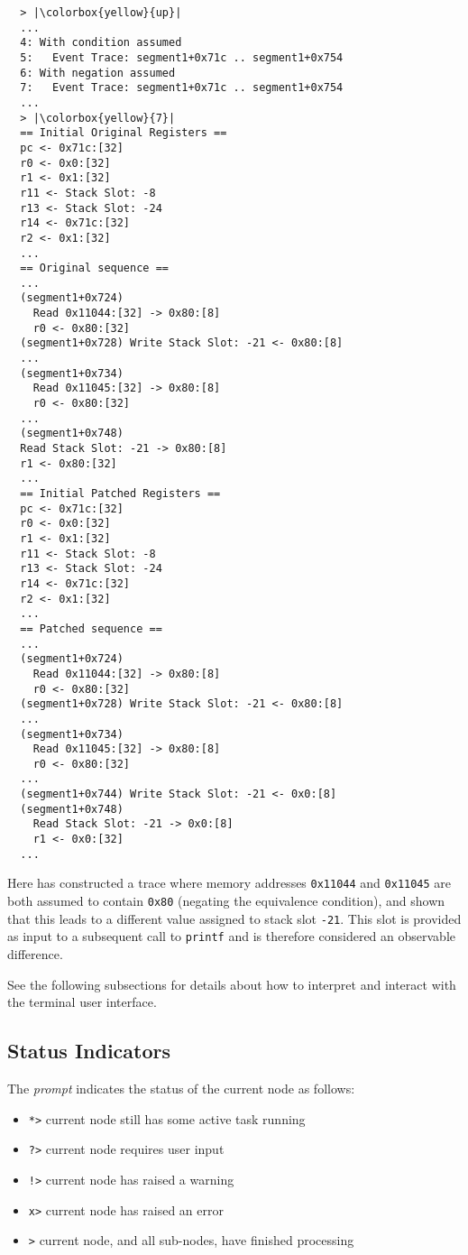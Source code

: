 \begin{lstlisting}
  > |\colorbox{yellow}{up}|
  ...
  4: With condition assumed
  5:   Event Trace: segment1+0x71c .. segment1+0x754
  6: With negation assumed
  7:   Event Trace: segment1+0x71c .. segment1+0x754
  ...
  > |\colorbox{yellow}{7}|
  == Initial Original Registers ==
  pc <- 0x71c:[32]
  r0 <- 0x0:[32]
  r1 <- 0x1:[32]
  r11 <- Stack Slot: -8
  r13 <- Stack Slot: -24
  r14 <- 0x71c:[32]
  r2 <- 0x1:[32]
  ...
  == Original sequence ==
  ...
  (segment1+0x724)
    Read 0x11044:[32] -> 0x80:[8] 
    r0 <- 0x80:[32]
  (segment1+0x728) Write Stack Slot: -21 <- 0x80:[8] 
  ...
  (segment1+0x734)
    Read 0x11045:[32] -> 0x80:[8] 
    r0 <- 0x80:[32]
  ...
  (segment1+0x748)
  Read Stack Slot: -21 -> 0x80:[8] 
  r1 <- 0x80:[32]
  ...
  == Initial Patched Registers ==
  pc <- 0x71c:[32]
  r0 <- 0x0:[32]
  r1 <- 0x1:[32]
  r11 <- Stack Slot: -8
  r13 <- Stack Slot: -24
  r14 <- 0x71c:[32]
  r2 <- 0x1:[32]
  ...
  == Patched sequence ==
  ...
  (segment1+0x724)
    Read 0x11044:[32] -> 0x80:[8] 
    r0 <- 0x80:[32]
  (segment1+0x728) Write Stack Slot: -21 <- 0x80:[8] 
  ...
  (segment1+0x734)
    Read 0x11045:[32] -> 0x80:[8] 
    r0 <- 0x80:[32]
  ...
  (segment1+0x744) Write Stack Slot: -21 <- 0x0:[8] 
  (segment1+0x748)
    Read Stack Slot: -21 -> 0x0:[8] 
    r1 <- 0x0:[32]
  ...
\end{lstlisting}

Here \pate{} has constructed a trace where memory addresses \texttt{0x11044} and \texttt{0x11045} are both assumed
to contain \texttt{0x80} (negating the equivalence condition), and shown that this leads to a different value
assigned to stack slot \texttt{-21}. This slot is provided as input to a subsequent call to \texttt{printf} and is 
therefore considered an observable difference.

See the following subsections for details about how to interpret and interact with the terminal user interface.

\subsection{Status Indicators}

The \emph{prompt} indicates the status of the current node as follows:
\begin{itemize}
\item \texttt{*>} current node still has some active task running
\item \texttt{?>} current node requires user input
\item \texttt{!>} current node has raised a warning
\item \texttt{x>} current node has raised an error
\item \texttt{>} current node, and all sub-nodes, have finished processing
\end{itemize}

